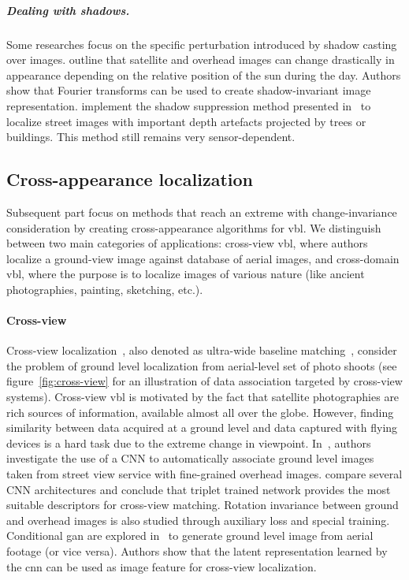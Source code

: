 			\subparagraph{Dealing with shadows.}
				Some researches focus on the specific perturbation introduced by shadow casting over images. \citet{Wan2016} outline that satellite and overhead images can change drastically in appearance depending on the relative position of the sun during the day. Authors show that Fourier transforms can be used to create shadow-invariant image representation. \citet{Corke2013} implement the shadow suppression method presented in~\citep{Finlayson2006} to localize street images with important depth artefacts projected by trees or buildings. This method still remains very sensor-dependent.

	\subsection{Cross-appearance localization}
	\label{subsec:cross_domain}
		Subsequent part focus on methods that reach an extreme with change-invariance consideration by creating cross-appearance algorithms for \ac{vbl}. We distinguish between two main categories of applications: cross-view \ac{vbl}, where authors localize a ground-view image against database of aerial images, and cross-domain \ac{vbl}, where the purpose is to localize images of various nature (like  ancient photographies, painting, sketching, etc.).
		
		\paragraph{Cross-view}
			\label{para:cross_view}
			Cross-view localization~\citep{Lin2013,Workman2015,Castaldo2015,Vo2016,Tian2017}, also denoted as ultra-wide baseline matching~\citep{Bansal2012}, consider the problem of ground level localization from aerial-level set of photo shoots (see figure~\ref{fig:cross-view} for an illustration of data association targeted by cross-view systems). Cross-view \ac{vbl} is motivated by the fact that satellite photographies are rich sources of information, available almost all over the globe. However, finding similarity between data acquired at a ground level and data captured with flying devices is a hard task due to the extreme change in viewpoint. In~\citep{Workman2015,Vo2016}, authors investigate the use of a CNN to automatically associate ground level images taken from street view service with fine-grained overhead images. \citet{Vo2016} compare several CNN architectures and conclude that triplet trained network provides the most suitable descriptors for cross-view matching. Rotation invariance between ground and overhead images is also studied through auxiliary loss and special training. Conditional \ac{gan} are explored in~\citep{Regmi2018} to generate ground level image from aerial footage (or vice versa). Authors show that the latent representation learned by the \ac{cnn} can be used as image feature for cross-view localization.
						
